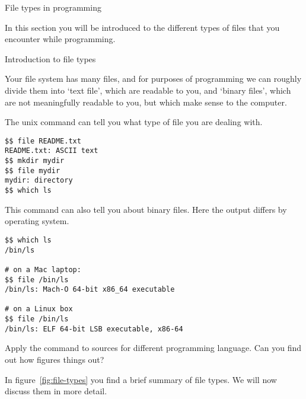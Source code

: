 
 {File types in programming}

\begin{purpose}
  In this section you will be introduced to the different types of
  files that you encounter while programming.
\end{purpose}

 {Introduction to file types}

Your file system has many files, and for purposes of programming
we can roughly divide them into `text file', which are readable to you,
and `binary files', which are not meaningfully readable to you,
but which make sense to the computer.

The unix command  can tell you what type
of file you are dealing with.
\begin{verbatim}
$$ file README.txt
README.txt: ASCII text
$$ mkdir mydir
$$ file mydir
mydir: directory
$$ which ls  
\end{verbatim}

This command can also tell you about binary files.
Here the output differs by operating system.
\begin{verbatim}
$$ which ls
/bin/ls

# on a Mac laptop:
$$ file /bin/ls
/bin/ls: Mach-O 64-bit x86_64 executable

# on a Linux box
$$ file /bin/ls
/bin/ls: ELF 64-bit LSB executable, x86-64
\end{verbatim}

\begin{exercise}
  Apply the  command to sources for different programming
  language. Can you find out how  figures things out?
\end{exercise}

In figure~\ref{fig:file-types} you find a brief summary of file types.
We will now discuss them in more detail.

